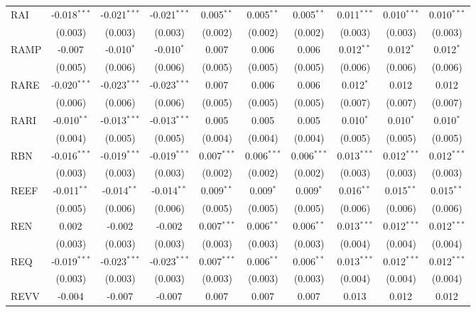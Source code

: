 \begin{table}[!htbp]
\begin{tabular}{@{\extracolsep{5pt}}lccccccccc}
 RAI & -0.018$^{***}$ & -0.021$^{***}$ & -0.021$^{***}$ & 0.005$^{**}$ & 0.005$^{**}$ & 0.005$^{**}$ & 0.011$^{***}$ & 0.010$^{***}$ & 0.010$^{***}$ \\
  & (0.003) & (0.003) & (0.003) & (0.002) & (0.002) & (0.002) & (0.003) & (0.003) & (0.003) \\
 RAMP & -0.007$^{}$ & -0.010$^{*}$ & -0.010$^{*}$ & 0.007$^{}$ & 0.006$^{}$ & 0.006$^{}$ & 0.012$^{**}$ & 0.012$^{*}$ & 0.012$^{*}$ \\
  & (0.005) & (0.006) & (0.006) & (0.005) & (0.005) & (0.005) & (0.006) & (0.006) & (0.006) \\
 RARE & -0.020$^{***}$ & -0.023$^{***}$ & -0.023$^{***}$ & 0.007$^{}$ & 0.006$^{}$ & 0.006$^{}$ & 0.012$^{*}$ & 0.012$^{}$ & 0.012$^{}$ \\
  & (0.006) & (0.006) & (0.006) & (0.005) & (0.005) & (0.005) & (0.007) & (0.007) & (0.007) \\
 RARI & -0.010$^{**}$ & -0.013$^{***}$ & -0.013$^{***}$ & 0.005$^{}$ & 0.005$^{}$ & 0.005$^{}$ & 0.010$^{*}$ & 0.010$^{*}$ & 0.010$^{*}$ \\
  & (0.004) & (0.005) & (0.005) & (0.004) & (0.004) & (0.004) & (0.005) & (0.005) & (0.005) \\
 RBN & -0.016$^{***}$ & -0.019$^{***}$ & -0.019$^{***}$ & 0.007$^{***}$ & 0.006$^{***}$ & 0.006$^{***}$ & 0.013$^{***}$ & 0.012$^{***}$ & 0.012$^{***}$ \\
  & (0.003) & (0.003) & (0.003) & (0.002) & (0.002) & (0.002) & (0.003) & (0.003) & (0.003) \\
 REEF & -0.011$^{**}$ & -0.014$^{**}$ & -0.014$^{**}$ & 0.009$^{**}$ & 0.009$^{*}$ & 0.009$^{*}$ & 0.016$^{**}$ & 0.015$^{**}$ & 0.015$^{**}$ \\
  & (0.005) & (0.006) & (0.006) & (0.005) & (0.005) & (0.005) & (0.006) & (0.006) & (0.006) \\
 REN & 0.002$^{}$ & -0.002$^{}$ & -0.002$^{}$ & 0.007$^{***}$ & 0.006$^{**}$ & 0.006$^{**}$ & 0.013$^{***}$ & 0.012$^{***}$ & 0.012$^{***}$ \\
  & (0.003) & (0.003) & (0.003) & (0.003) & (0.003) & (0.003) & (0.004) & (0.004) & (0.004) \\
 REQ & -0.019$^{***}$ & -0.023$^{***}$ & -0.023$^{***}$ & 0.007$^{***}$ & 0.006$^{**}$ & 0.006$^{**}$ & 0.013$^{***}$ & 0.012$^{***}$ & 0.012$^{***}$ \\
  & (0.003) & (0.003) & (0.003) & (0.003) & (0.003) & (0.003) & (0.004) & (0.004) & (0.004) \\
 REVV & -0.004$^{}$ & -0.007$^{}$ & -0.007$^{}$ & 0.007$^{}$ & 0.007$^{}$ & 0.007$^{}$ & 0.013$^{}$ & 0.012$^{}$ & 0.012$^{}$ \\

\end{tabular}
\end{table}
